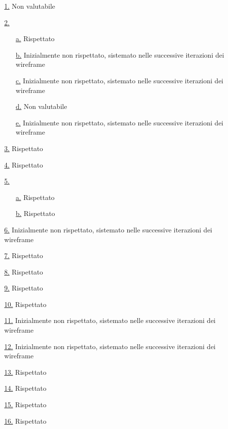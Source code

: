 \begin{itemize}
    \item[{\hyperref[lg:1]{1.}}] Non valutabile
    \item[{\hyperref[lg:2]{2.}}] \begin{itemize}
        \item[{\hyperref[lg:2.a]{a.}}] Rispettato
        \item[{\hyperref[lg:2.b]{b.}}] Inizialmente non rispettato, sistemato nelle successive iterazioni dei wireframe
        \item[{\hyperref[lg:2.c]{c.}}] Inizialmente non rispettato, sistemato nelle successive iterazioni dei wireframe
        \item[{\hyperref[lg:2.d]{d.}}] Non valutabile
        \item[{\hyperref[lg:2.e]{e.}}] Inizialmente non rispettato, sistemato nelle successive iterazioni dei wireframe
    \end{itemize}
    \item[{\hyperref[lg:3]{3.}}] Rispettato
    \item[{\hyperref[lg:4]{4.}}] Rispettato
    \item[{\hyperref[lg:5]{5.}}] \begin{itemize}
        \item[{\hyperref[lg:5.a]{a.}}] Rispettato
        \item[{\hyperref[lg:5.b]{b.}}] Rispettato
    \end{itemize}
    \item[{\hyperref[lg:6]{6.}}] Inizialmente non rispettato, sistemato nelle successive iterazioni dei wireframe
    \item[{\hyperref[lg:7]{7.}}] Rispettato
    \item[{\hyperref[lg:8]{8.}}] Rispettato
    \item[{\hyperref[lg:9]{9.}}] Rispettato
    \item[{\hyperref[lg:10]{10.}}] Rispettato
    \item[{\hyperref[lg:11]{11.}}] Inizialmente non rispettato, sistemato nelle successive iterazioni dei wireframe
    \item[{\hyperref[lg:12]{12.}}] Inizialmente non rispettato, sistemato nelle successive iterazioni dei wireframe
    \item[{\hyperref[lg:13]{13.}}] Rispettato
    \item[{\hyperref[lg:14]{14.}}] Rispettato
    \item[{\hyperref[lg:15]{15.}}] Rispettato
    \item[{\hyperref[lg:16]{16.}}] Rispettato

\end{itemize}
